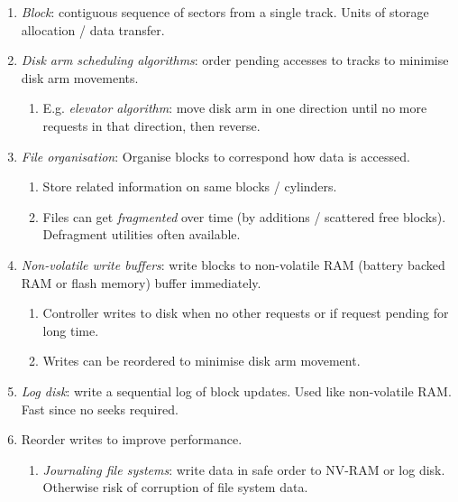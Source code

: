 \documentclass[twocolumn,english]{article}
\begin{document}
\begin{enumerate}
\item \emph{Block}: contiguous sequence of sectors from a single track.
Units of storage allocation / data transfer.
\item \emph{Disk arm scheduling algorithms}: order pending accesses to tracks
to minimise disk arm movements.

\begin{enumerate}
\item E.g. \emph{elevator algorithm}: move disk arm in one direction until
no more requests in that direction, then reverse.
\end{enumerate}
\item \emph{File organisation}: Organise blocks to correspond how data is
accessed.

\begin{enumerate}
\item Store related information on same blocks / cylinders.
\item Files can get \emph{fragmented} over time (by additions / scattered
free blocks). Defragment utilities often available.
\end{enumerate}
\item \emph{Non-volatile write buffers}: write blocks to non-volatile RAM
(battery backed RAM or flash memory) buffer immediately.

\begin{enumerate}
\item Controller writes to disk when no other requests or if request pending
for long time.
\item Writes can be reordered to minimise disk arm movement.
\end{enumerate}
\item \emph{Log disk}: write a sequential log of block updates. Used like
non-volatile RAM. Fast since no seeks required.
\item Reorder writes to improve performance.

\begin{enumerate}
\item \emph{Journaling file systems}: write data in safe order to NV-RAM
or log disk. Otherwise risk of corruption of file system data.
\end{enumerate}
\end{enumerate}
\end{document}
